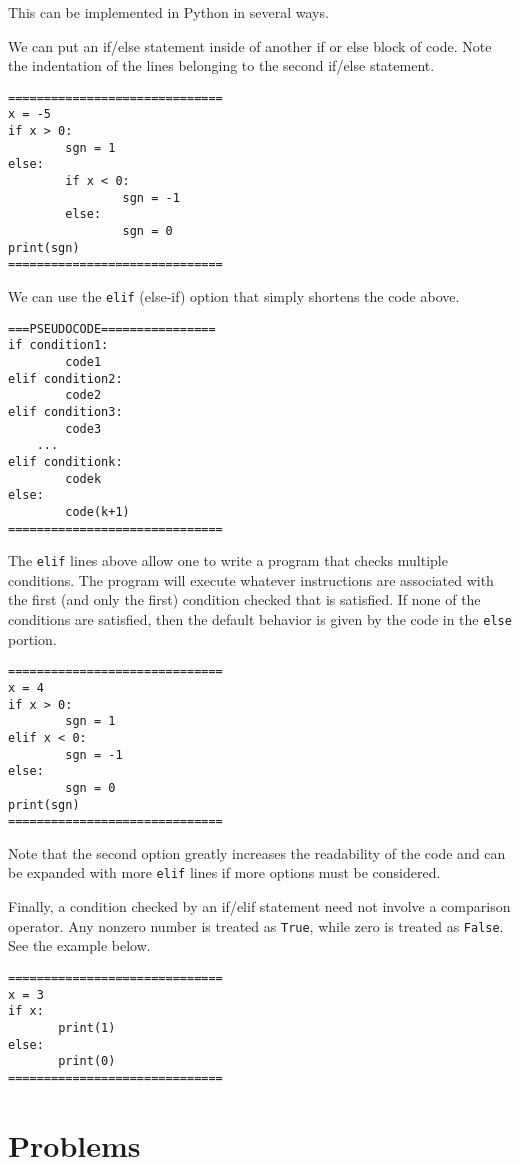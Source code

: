 \documentclass{ximera}
\begin{document}
This can be implemented in Python in several ways.

We can put an if/else statement inside of another if or else block of code. Note the indentation of the lines belonging to the second if/else statement.

\begin{verbatim}
==============================
x = -5
if x > 0:
        sgn = 1
else:
        if x < 0:
                sgn = -1
        else:
                sgn = 0
print(sgn)
==============================
\end{verbatim}
	
We can use the \verb|elif| (else-if) option that simply shortens the code above.

\begin{verbatim}
===PSEUDOCODE================
if condition1:
        code1
elif condition2:
        code2
elif condition3:
        code3
    ...
elif conditionk:
        codek
else:
        code(k+1)
==============================
\end{verbatim}

The \verb|elif| lines above allow one to write a program that checks multiple conditions. The program will execute whatever instructions are associated with the first (and only the first) condition checked that is satisfied. If none of the conditions are satisfied, then the default behavior is given by the code in the \verb|else| portion.

\begin{verbatim}
==============================
x = 4
if x > 0:
        sgn = 1
elif x < 0:
        sgn = -1
else:
        sgn = 0
print(sgn)
==============================
\end{verbatim}

Note that the second option greatly increases the readability of the code and can be expanded with more \verb|elif| lines if more options must be considered.

Finally, a condition checked by an if/elif statement need not involve a comparison operator. Any nonzero number is treated as \verb|True|, while zero is treated as \verb|False|. See the example below.

\begin{verbatim}
==============================
x = 3
if x:
       print(1)
else:
       print(0)
==============================
\end{verbatim}

\section{Problems}
\end{document}
